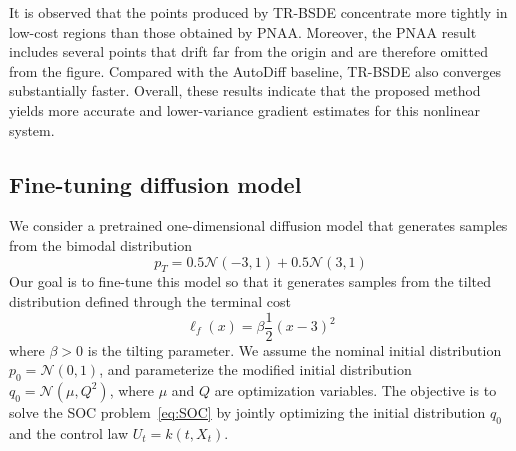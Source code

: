 \documentclass[letterpaper, 10 pt, conference]{ieeeconf}  %
\newcommand{\ud}{\,\mathrm{d}}
\begin{document}
It is observed that the points produced by TR-BSDE concentrate more tightly in low-cost regions than those obtained by PNAA. Moreover, the PNAA result includes several points that drift far from the origin and are therefore omitted from the figure.  Compared with the AutoDiff baseline, TR-BSDE also converges substantially faster.  Overall, these results indicate that the proposed method yields more accurate and lower-variance gradient estimates for this nonlinear system. 

\subsection{Fine-tuning diffusion model}\label{sec:num-diff}
We consider a pretrained one-dimensional diffusion model
that generates samples from the bimodal distribution 
\[p_T = 0.5\mathcal{N}(-3,1) + 0.5\mathcal N(3,1)\]
Our goal is to fine-tune this model so that it generates samples from the tilted distribution defined through the terminal cost
\begin{equation*}
    \ell_f(x) = \beta \frac{1}{2}(x-3)^2
\end{equation*}
where $\beta>0$ is the tilting parameter. We assume the nominal initial distribution $p_0 = \mathcal N(0,1)$, and parameterize the modified initial distribution  $q_0=\mathcal N(\mu,Q^2)$, where $\mu$ and $Q$ are optimization variables. The objective is to solve the SOC problem~\eqref{eq:SOC} by jointly optimizing the initial distribution  $q_0$ and the control law $U_t=k(t,X_t)$. 
\end{document}
